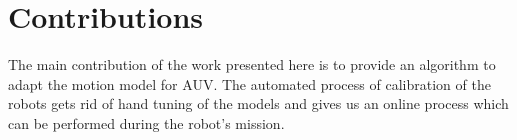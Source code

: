 \documentclass[12pt,draft]{dalcsthesis}
\begin{document}

 

\section{Contributions}
The main contribution of the work presented here is to provide an algorithm to adapt the motion model for AUV. The automated process of calibration of the robots gets rid of hand tuning of the models and gives us an online process which can be performed during the robot's mission. 
  

\end{document}
